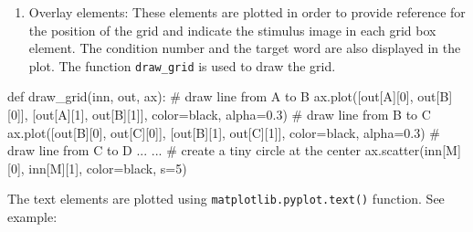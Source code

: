 \documentclass[
  a4paper,
]{article}
\newenvironment{Shaded}{}{}
\newcommand{\CommentTok}[1]{\textcolor[rgb]{0.42,0.45,0.49}{#1}}
\newcommand{\DecValTok}[1]{\textcolor[rgb]{0.00,0.36,0.77}{#1}}
\newcommand{\FloatTok}[1]{\textcolor[rgb]{0.00,0.36,0.77}{#1}}
\newcommand{\KeywordTok}[1]{\textcolor[rgb]{0.84,0.23,0.29}{#1}}
\newcommand{\NormalTok}[1]{\textcolor[rgb]{0.14,0.16,0.18}{#1}}
\newcommand{\OperatorTok}[1]{\textcolor[rgb]{0.14,0.16,0.18}{#1}}
\newcommand{\StringTok}[1]{\textcolor[rgb]{0.01,0.18,0.38}{#1}}
\providecommand{\tightlist}{%
  \setlength{\itemsep}{0pt}\setlength{\parskip}{0pt}}\usepackage{longtable,booktabs,array}
\begin{document}
\begin{enumerate}
\def\labelenumi{\arabic{enumi}.}
\tightlist
\item
  Overlay elements: These elements are plotted in order to provide
  reference for the position of the grid and indicate the stimulus image
  in each grid box element. The condition number and the target word are
  also displayed in the plot. The function \texttt{draw\_grid} is used
  to draw the grid.
\end{enumerate}

\begin{Shaded}
\begin{Highlighting}[]
\KeywordTok{def}\NormalTok{ draw\_grid(inn, out, ax):}
    \CommentTok{\# draw line from A to B}
\NormalTok{    ax.plot([out[}\StringTok{\textquotesingle{}A\textquotesingle{}}\NormalTok{][}\DecValTok{0}\NormalTok{], out[}\StringTok{\textquotesingle{}B\textquotesingle{}}\NormalTok{][}\DecValTok{0}\NormalTok{]], [out[}\StringTok{\textquotesingle{}A\textquotesingle{}}\NormalTok{][}\DecValTok{1}\NormalTok{], out[}\StringTok{\textquotesingle{}B\textquotesingle{}}\NormalTok{][}\DecValTok{1}\NormalTok{]], color}\OperatorTok{=}\StringTok{\textquotesingle{}black\textquotesingle{}}\NormalTok{, alpha}\OperatorTok{=}\FloatTok{0.3}\NormalTok{)}
    \CommentTok{\# draw line from B to C}
\NormalTok{    ax.plot([out[}\StringTok{\textquotesingle{}B\textquotesingle{}}\NormalTok{][}\DecValTok{0}\NormalTok{], out[}\StringTok{\textquotesingle{}C\textquotesingle{}}\NormalTok{][}\DecValTok{0}\NormalTok{]], [out[}\StringTok{\textquotesingle{}B\textquotesingle{}}\NormalTok{][}\DecValTok{1}\NormalTok{], out[}\StringTok{\textquotesingle{}C\textquotesingle{}}\NormalTok{][}\DecValTok{1}\NormalTok{]], color}\OperatorTok{=}\StringTok{\textquotesingle{}black\textquotesingle{}}\NormalTok{, alpha}\OperatorTok{=}\FloatTok{0.3}\NormalTok{)}
    \CommentTok{\# draw line from C to D}
\NormalTok{    ...}
\NormalTok{    ...}
    \CommentTok{\# create a tiny circle at the center}
\NormalTok{    ax.scatter(inn[}\StringTok{\textquotesingle{}M\textquotesingle{}}\NormalTok{][}\DecValTok{0}\NormalTok{], inn[}\StringTok{\textquotesingle{}M\textquotesingle{}}\NormalTok{][}\DecValTok{1}\NormalTok{], color}\OperatorTok{=}\StringTok{\textquotesingle{}black\textquotesingle{}}\NormalTok{, s}\OperatorTok{=}\DecValTok{5}\NormalTok{)}
\end{Highlighting}
\end{Shaded}

The text elements are plotted using \texttt{matplotlib.pyplot.text()}
function. See example:
\end{document}
